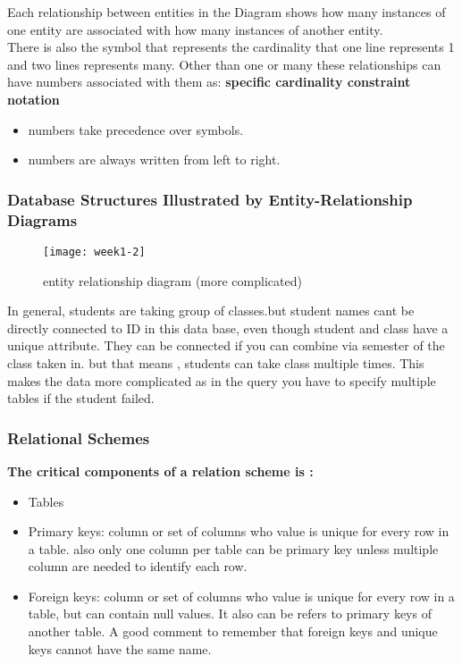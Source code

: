 \documentclass{article}
\begin{document}
Each relationship between entities in the Diagram shows how many instances of one entity are associated with how many instances of another entity. \\

There is also the symbol that represents the cardinality that one line represents 1 and two lines represents many. Other than one or many these relationships can have numbers associated with them as:
\textbf{specific cardinality constraint notation}
\begin{itemize}
\item  numbers take precedence over symbols.
\item numbers are always written from left to right.
\end{itemize}
\pagebreak

\subsubsection*{Database Structures Illustrated by Entity-Relationship Diagrams}

\begin{figure}[h]

\centering
\texttt{[image: week1-2]}

\caption{entity relationship diagram (more complicated) }
\end{figure}

In general, students are taking group of classes.but student names cant be directly connected to ID in this data base, even though student and class have a unique attribute. They can be connected if you can combine via semester of the class taken in. but that means , students can take class multiple times. This makes the data more complicated as in the query you have to specify multiple tables if the student failed. 

\subsubsection*{Relational Schemes}
\textbf{The critical components of a relation scheme is :}
\begin{itemize}

\item Tables 
\item Primary keys: column or set of columns who value is unique for every row in a table. also only one column per table can be primary key unless multiple column are needed to identify each row.
\item Foreign keys: column or set of columns who value is unique for every row in a table, but can contain null values. It also can be refers to primary keys of another table. A good comment to remember that foreign keys and unique keys cannot have the same name.  
\end{itemize}
\end{document}
